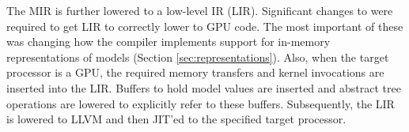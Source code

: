 The MIR is further lowered to a low-level IR (LIR). 
Significant changes to \TreebeardOLD{} were required to get
LIR to correctly lower to GPU code. The most important of these was 
changing how the compiler implements support for in-memory 
representations of models (Section \ref{sec:representations}).
Also, when the target processor is a GPU, the required memory transfers and kernel
invocations are inserted into the LIR. Buffers 
to hold model values are inserted and abstract tree operations are lowered to
explicitly refer to these buffers.
Subsequently, the LIR is lowered to LLVM and then JIT'ed to the 
specified target processor.


